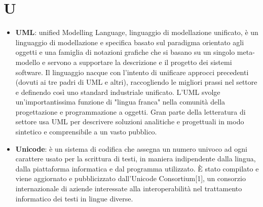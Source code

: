 \section{U}
\begin{itemize} 
	\item
	\textbf{UML}: unified Modelling Language, linguaggio di modellazione unificato, è un linguaggio di modellazione e specifica basato sul paradigma orientato agli oggetti e una famiglia di notazioni grafiche che si basano su un singolo meta-modello e servono a supportare la descrizione e il progetto dei sistemi software.  Il linguaggio nacque con l'intento di unificare approcci precedenti (dovuti ai tre padri di UML e altri), raccogliendo le migliori prassi nel settore e definendo così uno standard industriale unificato.
	L'UML svolge un'importantissima funzione di "lingua franca" nella comunità della progettazione e programmazione a oggetti. Gran parte della letteratura di settore usa UML per descrivere soluzioni analitiche e progettuali in modo sintetico e comprensibile a un vasto pubblico.
	\item
	\textbf{Unicode}:  è un sistema di codifica che assegna un numero univoco ad ogni carattere usato per la scrittura di testi, in maniera indipendente dalla lingua, dalla piattaforma informatica e dal programma utilizzato.
	È stato compilato e viene aggiornato e pubblicizzato dall'Unicode Consortium[1], un consorzio internazionale di aziende interessate alla interoperabilità nel trattamento informatico dei testi in lingue diverse.
\end{itemize}